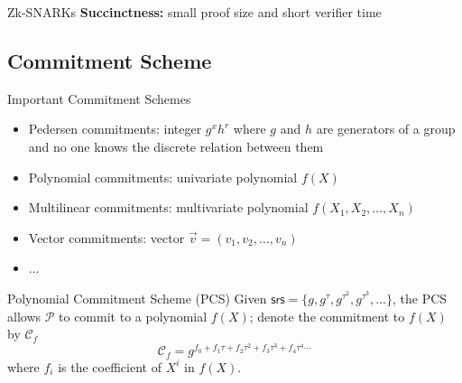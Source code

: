 \documentclass{beamer}
\newcommand{\cm}{\mathcal{C}} %
\begin{document}
  \begin{frame}{Zk-SNARKs}
    \textbf{Succinctness:} small proof size and short verifier time \\
    \vspace{1em}
  \end{frame}

  \subsection{Commitment Scheme}
  \begin{frame}{Important Commitment Schemes}
    \begin{itemize}
      \item Pedersen commitments: integer $g^xh^r$ where $g$ and $h$ are generators of a group and no one knows the discrete relation between them
      \item Polynomial commitments: univariate polynomial $f(X)$
      \item Multilinear commitments: multivariate polynomial $f(X_1,X_2,\dots,X_n)$
      \item Vector commitments: vector $\overrightarrow{v}=(v_1,v_2,\dots,v_n)$
      \item ...
    \end{itemize}
  \end{frame}

  \begin{frame}{Polynomial Commitment Scheme (PCS)}
    Given $\mathsf{srs}=\{g,g^\tau,g^{\tau^2},g^{\tau^3},\dots\}$, the PCS allows $\mathcal{P}$ to commit to a polynomial $f(X)$; denote the commitment to $f(X)$ by $\cm_f$
    $$
    \cm_f=g^{f_0+f_1\tau+f_2\tau^2+f_3\tau^3+f_4\tau^4\cdots}
    $$
    where $f_i$ is the coefficient of $X^i$ in $f(X)$.
  \end{frame}
\end{document}
